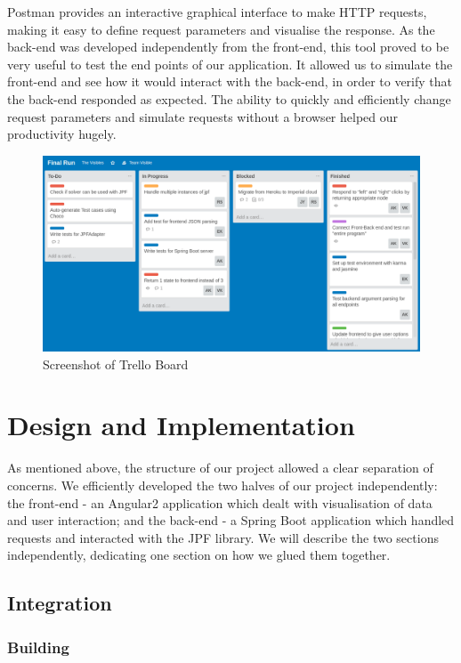 \documentclass[titlepage,11pt]{article}
\begin{document}
Postman \cite{postman} provides an interactive graphical interface to make HTTP requests, making it easy to define request parameters and visualise the response. As the back-end was developed independently from the front-end, this tool proved to be very useful to test the end points of our application. It allowed us to simulate the front-end and see how it would interact with the back-end, in order to verify that the back-end responded as expected. The ability to quickly and efficiently change request parameters and simulate requests without a browser helped our productivity hugely.

\begin{figure}
\centering
\includegraphics[scale=0.45]{trello.png}
\caption{Screenshot of Trello Board}
\label{fig:trello}
\end{figure}

\section{Design and Implementation}

As mentioned above, the structure of our project allowed a clear separation of concerns. We efficiently developed the two halves of our project independently: the front-end - an Angular2 application which dealt with visualisation of data and user interaction; and the back-end - a Spring Boot application which handled requests and interacted with the JPF library. We will describe the two sections independently, dedicating one section on how we glued them together.

\subsection{Integration}

\subsubsection{Building}
\end{document}
